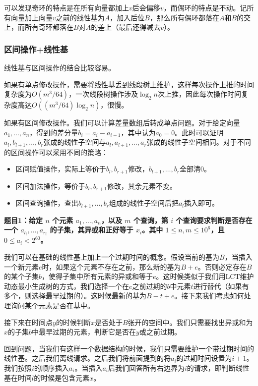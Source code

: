 \documentclass[UTF8, twoside]{ctexart}
\begin{document}
\begin{sloppypar}
可以发现奇环的特点是在所有向量都加上$v$后会偏移$v$，而偶环的特点是不动。记所有向量加上向量$v$之前的线性基为$A$，加入后位$B$，那么所有偶环都落在$A$和$B$的交上，而所有奇环都落在$B$对$A$的差上（最后还得减去$v$）。

\subsubsection{区间操作+线性基}

线性基与区间操作的结合比较容易。

如果有单点修改操作，需要将线性基丢到线段树上维护，这样每次操作上推的时间复杂度为$O(m^3/64)$，一次线段树操作涉及$\log_2n$次上推，因此每次操作时间复杂度高达$O((m^3/64)\log_2n)$，很慢。

如果有区间修改操作。我们可以计算差量数组后转成单点问题。对于给定向量$a_1,\ldots,a_n$，得到的差分量$b_i=a_i-a_{i-1}$，其中认为$a_0=0$。此时可以证明$a_l,b_{l+1},\ldots,b_{r}$张成的线性子空间与$a_l,a_{l+1},\ldots,a_r$张成的线性子空间相同。对于不同的区间操作可以采用不同的策略：

\begin{itemize}
   \item 区间赋值操作，实际上等价于$b_l,b_{r+1}$修改，$b_{l+1},\ldots,b_r$全部清$0$。
   \item 区间加法操作，等价于$b_l,b_{r+1}$修改，其余元素不变。
   \item 区间查询操作，查出$b_{l+1},\ldots,b_{r}$组成的线性子空间后把$a_l$插入即可。
\end{itemize}

\textbf{题目1：给定 $n$ 个元素 $a_1,\ldots,a_n$，以及 $m$ 个查询，第 $i$ 个查询要求判断是否存在一个 $a_{l_i},\ldots,a_{r_i}$ 的子集，其异或和正好等于 $x_i$。其中 $1\leq n,m\leq 10^6$，且 $0\leq a_i< 2^{60}$。}

我们可以在基础的线性基上加上一个过期时间的概念。假设当前的基为$B$，当插入一个新元素$e$时，如果这个元素不存在之前，那么新的基为$B+e$。否则必定存在$B$的某个子集$b$，使得子集中所有元素的异或和等于$e$。这时候类似于我们用LCT维护动态最小生成树的方式，我们选择一个在$e$之前过期的$b$中元素$t$进行替代（如果有多个，则选择最早过期的）。这时候最新的基为$B-t+e$。接下来我们考虑如何处理询问某个元素是否在基中。

接下来在时间点$y$的时候判断$x$是否处于$B$张开的空间中。我们只需要找出异或和为$x$的子集$b$中最早过期的元素，判断它是否在$y$或之前过期。

回到问题，当我们有这样一个数据结构的时候，我们只需要维护一个带过期时间的线性基。之后我们离线请求。之后我们将前面提到的将$a_i$的过期时间设置为$i+1$。我们按照$i$的顺序插入$a_i$。当插入$a_i$后我们回答所有右边界为$i$的请求，即判断线性基在时间$l$的时候是包含元素$x$。


\end{sloppypar}
\end{document}
